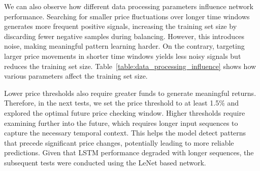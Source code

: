 \documentclass[a4paper,oneside,onecolumn,12pt]{book}
\begin{document}
		We can also observe how different data processing parameters influence network performance. Searching for smaller price fluctuations over longer time windows generates more frequent positive signals, increasing the training set size by discarding fewer negative samples during balancing. However, this introduces noise, making meaningful pattern learning harder. On the contrary, targeting larger price movements in shorter time windows yields less noisy signals but reduces the training set size. Table~\ref{table:data_processing_influence} shows how various parameters affect the training set size.
		\begin{table}[H]
			\begin{center}
			\end{center}
			\caption{The influence of data processing parameters on training set size (184 days).}
			\label{table:data_processing_influence}
		\end{table}	

		Lower price thresholds also require greater funds to generate meaningful returns. Therefore, in the next tests, we set the price threshold to at least 1.5\% and explored the optimal future price checking window. Higher thresholds require examining further into the future, which requires longer input sequences to capture the necessary temporal context. This helps the model detect patterns that precede significant price changes, potentially leading to more reliable predictions. Given that LSTM performance degraded with longer sequences, the subsequent tests were conducted using the LeNet based network.
\end{document}

